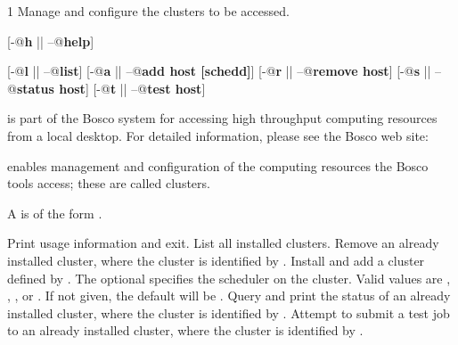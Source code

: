 \begin{ManPage}{\label{man-bosco-cluster}}{1}
{Manage and configure the clusters to be accessed. }


\Synopsis {}
[\verb@-@\textbf{h} || \verb@--@\textbf{help}]

[\verb@-@\textbf{l} || \verb@--@\textbf{list}]
[\verb@-@\textbf{a} || \verb@--@\textbf{add \lt{}host\gt{} [schedd]}]
[\verb@-@\textbf{r} || \verb@--@\textbf{remove \lt{}host\gt{}}]
[\verb@-@\textbf{s} || \verb@--@\textbf{status \lt{}host\gt{}}]
[\verb@-@\textbf{t} || \verb@--@\textbf{test \lt{}host\gt{}}]

\Description

 is part of the Bosco system for accessing high
throughput computing resources from a local desktop.
For detailed information, please see the Bosco web site:

 enables management and configuration of the computing resources
the Bosco tools access; these are called clusters.

A  is of the form .

\begin{Options}
   {Print usage information and exit.}
   {List all installed clusters.}
   {Remove an already installed cluster,
    where the cluster is identified by .}
    {Install and add a cluster defined by .
    The optional  specifies the scheduler on the cluster.
    Valid values are , , ,  or
    .  If not given, the default will be . }
   {Query and print the status of
    an already installed cluster,
    where the cluster is identified by .}
   {Attempt to submit a test job to 
    an already installed cluster,
    where the cluster is identified by .}

\end{Options}



\end{ManPage}
